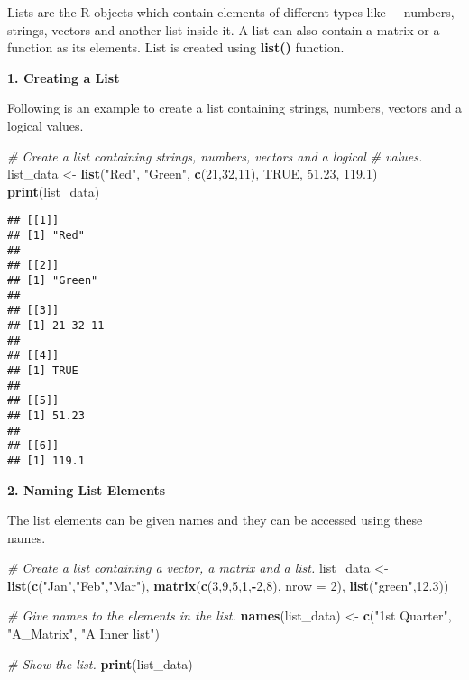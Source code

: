 \documentclass[
]{article}
\newenvironment{Shaded}{\begin{snugshade}}{\end{snugshade}}
\newcommand{\AttributeTok}[1]{\textcolor[rgb]{0.13,0.29,0.53}{#1}}
\newcommand{\CommentTok}[1]{\textcolor[rgb]{0.56,0.35,0.01}{\textit{#1}}}
\newcommand{\ConstantTok}[1]{\textcolor[rgb]{0.56,0.35,0.01}{#1}}
\newcommand{\DecValTok}[1]{\textcolor[rgb]{0.00,0.00,0.81}{#1}}
\newcommand{\FloatTok}[1]{\textcolor[rgb]{0.00,0.00,0.81}{#1}}
\newcommand{\FunctionTok}[1]{\textcolor[rgb]{0.13,0.29,0.53}{\textbf{#1}}}
\newcommand{\NormalTok}[1]{#1}
\newcommand{\OtherTok}[1]{\textcolor[rgb]{0.56,0.35,0.01}{#1}}
\newcommand{\SpecialCharTok}[1]{\textcolor[rgb]{0.81,0.36,0.00}{\textbf{#1}}}
\newcommand{\StringTok}[1]{\textcolor[rgb]{0.31,0.60,0.02}{#1}}
\begin{document}
Lists are the R objects which contain elements of different types like −
numbers, strings, vectors and another list inside it. A list can also
contain a matrix or a function as its elements. List is created using
\textbf{list()} function.

\textbf{1. Creating a List}

Following is an example to create a list containing strings, numbers,
vectors and a logical values.

\begin{Shaded}
\begin{Highlighting}[]
\CommentTok{\# Create a list containing strings, numbers, vectors and a logical}
\CommentTok{\# values.}
\NormalTok{list\_data }\OtherTok{\textless{}{-}} \FunctionTok{list}\NormalTok{(}\StringTok{"Red"}\NormalTok{, }\StringTok{"Green"}\NormalTok{, }\FunctionTok{c}\NormalTok{(}\DecValTok{21}\NormalTok{,}\DecValTok{32}\NormalTok{,}\DecValTok{11}\NormalTok{), }\ConstantTok{TRUE}\NormalTok{, }\FloatTok{51.23}\NormalTok{, }\FloatTok{119.1}\NormalTok{)}
\FunctionTok{print}\NormalTok{(list\_data)}
\end{Highlighting}
\end{Shaded}

\begin{verbatim}
## [[1]]
## [1] "Red"
## 
## [[2]]
## [1] "Green"
## 
## [[3]]
## [1] 21 32 11
## 
## [[4]]
## [1] TRUE
## 
## [[5]]
## [1] 51.23
## 
## [[6]]
## [1] 119.1
\end{verbatim}

\textbf{2. Naming List Elements}

The list elements can be given names and they can be accessed using
these names.

\begin{Shaded}
\begin{Highlighting}[]
\CommentTok{\# Create a list containing a vector, a matrix and a list.}
\NormalTok{list\_data }\OtherTok{\textless{}{-}} \FunctionTok{list}\NormalTok{(}\FunctionTok{c}\NormalTok{(}\StringTok{"Jan"}\NormalTok{,}\StringTok{"Feb"}\NormalTok{,}\StringTok{"Mar"}\NormalTok{), }\FunctionTok{matrix}\NormalTok{(}\FunctionTok{c}\NormalTok{(}\DecValTok{3}\NormalTok{,}\DecValTok{9}\NormalTok{,}\DecValTok{5}\NormalTok{,}\DecValTok{1}\NormalTok{,}\SpecialCharTok{{-}}\DecValTok{2}\NormalTok{,}\DecValTok{8}\NormalTok{), }\AttributeTok{nrow =} \DecValTok{2}\NormalTok{),}
   \FunctionTok{list}\NormalTok{(}\StringTok{"green"}\NormalTok{,}\FloatTok{12.3}\NormalTok{))}

\CommentTok{\# Give names to the elements in the list.}
\FunctionTok{names}\NormalTok{(list\_data) }\OtherTok{\textless{}{-}} \FunctionTok{c}\NormalTok{(}\StringTok{"1st Quarter"}\NormalTok{, }\StringTok{"A\_Matrix"}\NormalTok{, }\StringTok{"A Inner list"}\NormalTok{)}

\CommentTok{\# Show the list.}
\FunctionTok{print}\NormalTok{(list\_data)}
\end{Highlighting}
\end{Shaded}
\end{document}
